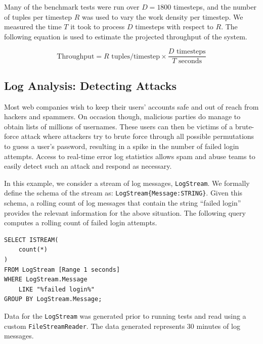 \documentclass[a4paper, 10pt, conference]{IEEEconf}
\begin{document}
Many of the benchmark tests were run over $D = 1800$ timesteps, and the number of tuples per timestep $R$ was used to vary the work density per timestep.  We measured the time $T$ it took to process $D$ timesteps with respect to $R$.  The following equation is used to estimate the projected throughput of the system.

$$
    \text{Throughput} = R \text{ tuples/timestep} \times \dfrac{D \text{ timesteps}}{T \text{ seconds}}
$$

\subsection{Log Analysis: Detecting Attacks}
Most web companies wish to keep their users' accounts safe and out of reach from hackers and spammers.  On occasion though, malicious parties do manage to obtain lists of millions of usernames.  These users can then be victims of a brute-force attack where attackers try to brute force through all possible permutations to guess a user's password, resulting in a spike in the number of failed login attempts. Access to real-time error log statistics allows spam and abuse teams to easily detect such an attack and respond as necessary.

In this example, we consider a stream of log messages, \texttt{LogStream}. We formally define the schema of the stream as: \texttt{LogStream\{Message:STRING\}}. Given this schema, a rolling count of log messages that contain the string ``failed login'' provides the relevant information for the above situation.  The following query computes a rolling count of failed login attempts.

\begin{lstlisting}
SELECT ISTREAM(
    count(*)
)
FROM LogStream [Range 1 seconds]
WHERE LogStream.Message
	LIKE "%failed login%"
GROUP BY LogStream.Message;
\end{lstlisting}
\begingroup
{}
\endgroup 

\vspace{3mm}

Data for the \texttt{LogStream} was generated prior to running tests and read using a custom \texttt{FileStreamReader}.  The data generated represents 30 minutes of log messages.
\end{document}
